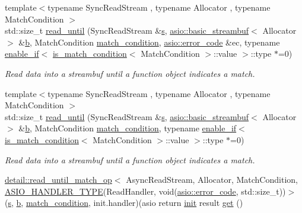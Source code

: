 \begin{DoxyCompactItemize}
{\footnotesize template$<$typename Sync\+Read\+Stream , typename Allocator , typename Match\+Condition $>$ }\\std\+::size\+\_\+t \hyperlink{group__read__until_gaacb23419d8878f33e469e3f743c738d6}{read\+\_\+until} (Sync\+Read\+Stream \&\hyperlink{group__async__connect_ga31ab74b9ea6c77932dddd016cfc7920a}{s}, \hyperlink{classasio_1_1basic__streambuf}{asio\+::basic\+\_\+streambuf}$<$ Allocator $>$ \&\hyperlink{group__async__read_ga945a5c18fa77a9e2eba420f8f44b2a4f}{b}, Match\+Condition \hyperlink{group__async__read__until_ga950b81fb954e4a0f01e13a57e15721b4}{match\+\_\+condition}, \hyperlink{classasio_1_1error__code}{asio\+::error\+\_\+code} \&ec, typename \hyperlink{structasio_1_1enable__if}{enable\+\_\+if}$<$ \hyperlink{structasio_1_1is__match__condition}{is\+\_\+match\+\_\+condition}$<$ Match\+Condition $>$\+::value $>$\+::type $\ast$=0)
\begin{DoxyCompactList}\small\item\em Read data into a streambuf until a function object indicates a match. \end{DoxyCompactList}\item 
{\footnotesize template$<$typename Sync\+Read\+Stream , typename Allocator , typename Match\+Condition $>$ }\\std\+::size\+\_\+t \hyperlink{group__read__until_ga5aa4b441eca98c82a144cb9a3c625db4}{read\+\_\+until} (Sync\+Read\+Stream \&\hyperlink{group__async__connect_ga31ab74b9ea6c77932dddd016cfc7920a}{s}, \hyperlink{classasio_1_1basic__streambuf}{asio\+::basic\+\_\+streambuf}$<$ Allocator $>$ \&\hyperlink{group__async__read_ga945a5c18fa77a9e2eba420f8f44b2a4f}{b}, Match\+Condition \hyperlink{group__async__read__until_ga950b81fb954e4a0f01e13a57e15721b4}{match\+\_\+condition}, typename \hyperlink{structasio_1_1enable__if}{enable\+\_\+if}$<$ \hyperlink{structasio_1_1is__match__condition}{is\+\_\+match\+\_\+condition}$<$ Match\+Condition $>$\+::value $>$\+::type $\ast$=0)
\begin{DoxyCompactList}\small\item\em Read data into a streambuf until a function object indicates a match. \end{DoxyCompactList}\item 
\hyperlink{classasio_1_1detail_1_1read__until__match__op}{detail\+::read\+\_\+until\+\_\+match\+\_\+op}$<$ Async\+Read\+Stream, Allocator, Match\+Condition, \hyperlink{handler__type_8hpp_a3e8a48d0097c0be0da56b81efe2c183e}{A\+S\+I\+O\+\_\+\+H\+A\+N\+D\+L\+E\+R\+\_\+\+T\+Y\+P\+E}(Read\+Handler, void(\hyperlink{classasio_1_1error__code}{asio\+::error\+\_\+code}, std\+::size\+\_\+t))$>$(\hyperlink{group__async__connect_ga31ab74b9ea6c77932dddd016cfc7920a}{s}, \hyperlink{group__async__read_ga945a5c18fa77a9e2eba420f8f44b2a4f}{b}, \hyperlink{group__async__read__until_ga950b81fb954e4a0f01e13a57e15721b4}{match\+\_\+condition}, init.\+handler)(asio return \hyperlink{namespaceasio_abae608ba848ec0b5f26a2e6f213dcf6d}{init} result \hyperlink{namespaceasio_aab95c6736198fcded5573a1d43fe25ed}{get} ()

\end{DoxyCompactItemize}
